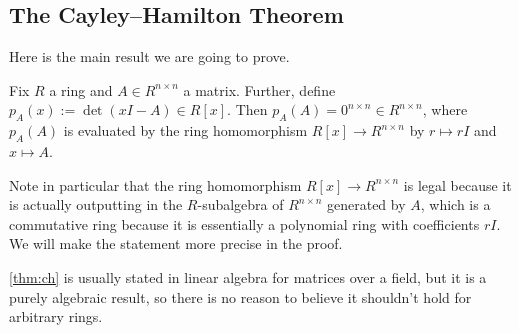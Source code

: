 \subsection{The Cayley--Hamilton Theorem}
Here is the main result we are going to prove.
\begin{theorem} \label{thm:ch}
	Fix $R$ a ring and $A\in R^{n\times n}$ a matrix. Further, define $p_A(x):=\det(xI-A)\in R[x]$. Then $p_A(A)=0^{n\times n}\in R^{n\times n}$, where $p_A(A)$ is evaluated by the ring homomorphism $R[x]\to R^{n\times n}$ by $r\mapsto rI$ and $x\mapsto A$.
\end{theorem}
Note in particular that the ring homomorphism $R[x]\to R^{n\times n}$ is legal because it is actually outputting in the $R$-subalgebra of $R^{n\times n}$ generated by $A$, which is a commutative ring because it is essentially a polynomial ring with coefficients $rI$. We will make the statement more precise in the proof.
\begin{remark}
	\autoref{thm:ch} is usually stated in linear algebra for matrices over a field, but it is a purely algebraic result, so there is no reason to believe it shouldn't hold for arbitrary rings.
\end{remark}
